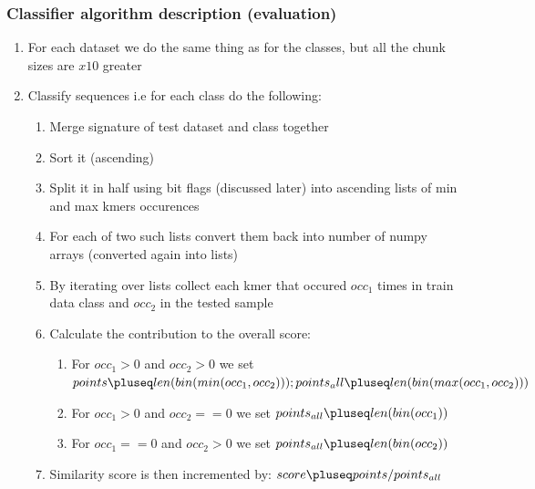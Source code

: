 \begin{frame}[fragile]
  \frametitle{Classifier algorithm description (evaluation)}
  \begin{enumerate}
    \scriptsize
    \item For each dataset we do the same thing as for the classes, but all the chunk sizes are $x10$ greater
    \item Classify sequences i.e for each class do the following:
    \begin{enumerate}
      \scriptsize
      \item Merge signature of test dataset and class together
      \item Sort it (ascending)
      \item Split it in half using bit flags (discussed later) into ascending lists of min and max kmers occurences
      \item For each of two such lists convert them back into number of numpy arrays (converted again into lists)
      \item By iterating over lists collect each kmer that occured $occ_1$ times in train data class and $occ_2$ in the tested sample
      \item Calculate the contribution to the overall score:
      \begin{enumerate}
        \scriptsize
        \item For $occ_1 > 0$ and $occ_2 > 0$ we set $points \pluseq len(bin(min(occ_1, occ_2))); points_all \pluseq len(bin(max(occ_1, occ_2)))$
        \item For $occ_1 > 0$ and $occ_2 == 0$ we set $points_{all} \pluseq len(bin(occ_1))$
        \item For $occ_1 == 0$ and $occ_2 > 0$ we set $points_{all} \pluseq len(bin(occ_2))$
      \end{enumerate}
      \item Similarity score is then incremented by: $score \pluseq points / points_{all}$
    \end{enumerate}
  \end{enumerate}
\end{frame}


